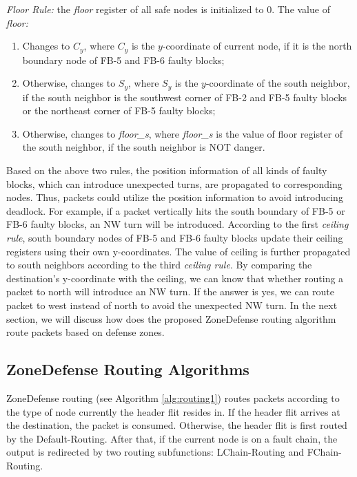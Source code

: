 \textit{Floor Rule:} the \textit{floor} register of all safe nodes is initialized to 0. The value of \textit{floor:}

\begin{enumerate}[1)]
    \item Changes to $C_{y}$, where $C_{y}$ is the $y$-coordinate of current node, if it is the north boundary node of FB-5 and FB-6 faulty blocks;
    \item Otherwise, changes to $S_{y}$, where $S_{y}$ is the $y$-coordinate of the south neighbor, if the south neighbor is the southwest corner of FB-2 and FB-5 faulty blocks or the northeast corner of FB-5 faulty blocks;
    \item Otherwise, changes to \textit{floor\_s}, where \textit{floor\_s} is the value of floor register of the south neighbor, if the south neighbor is NOT danger.
\end{enumerate}

Based on the above two rules, the position information of all kinds of faulty blocks, which can introduce unexpected turns, are propagated to corresponding nodes. Thus, packets could utilize the position information to avoid introducing deadlock. For example, if a packet vertically hits the south boundary of FB-5 or FB-6 faulty blocks, an NW turn will be introduced. According to the first \textit{ceiling rule}, south boundary nodes of FB-5 and FB-6 faulty blocks update their ceiling registers using their own y-coordinates. The value of ceiling is further propagated to south neighbors according to the third \textit{ceiling rule}. By comparing the destination’s y-coordinate with the ceiling, we can know that whether routing a packet to north will introduce an NW turn. If the answer is yes, we can route packet to west instead of north to avoid the unexpected NW turn. In the next section, we will discuss how does the proposed ZoneDefense routing algorithm route packets based on defense zones.

\subsection{ZoneDefense Routing Algorithms}
ZoneDefense routing (see Algorithm \ref{alg:routing1}) routes packets according to the type of node currently the header flit resides in. If the header flit arrives at the destination, the packet is consumed. Otherwise, the header flit is first routed by the Default-Routing. After that, if the current node is on a fault chain, the output is redirected by two routing subfunctions: LChain-Routing and FChain-Routing.

